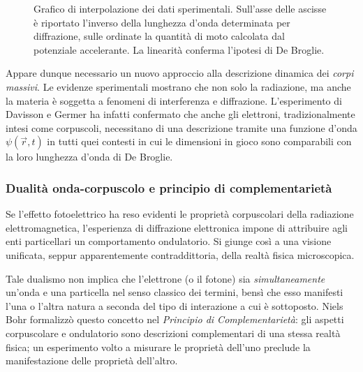 \documentclass[a4paper,11pt]{report}
\begin{document}
\begin{figure}[htbp]
    \caption{Grafico di interpolazione dei dati sperimentali. Sull'asse delle ascisse è riportato l'inverso della lunghezza d'onda determinata per diffrazione, sulle ordinate la quantità di moto calcolata dal potenziale accelerante. La linearità conferma l'ipotesi di De Broglie.}
    \label{fig:davisson_germer_plot}
\end{figure}

\noindent
Appare dunque necessario un nuovo approccio alla descrizione dinamica dei \textit{corpi massivi}. Le evidenze sperimentali mostrano che non solo la radiazione, ma anche la materia è soggetta a fenomeni di interferenza e diffrazione. L'esperimento di Davisson e Germer ha infatti confermato che anche gli elettroni, tradizionalmente intesi come corpuscoli, necessitano di una descrizione tramite una funzione d'onda $\psi(\vec{r}, t)$ in tutti quei contesti in cui le dimensioni in gioco sono comparabili con la loro lunghezza d'onda di De Broglie.

\subsubsection{Dualità onda-corpuscolo e principio di complementarietà}
Se l'effetto fotoelettrico ha reso evidenti le proprietà corpuscolari della radiazione elettromagnetica, l'esperienza di diffrazione elettronica impone di attribuire agli enti particellari un comportamento ondulatorio.
Si giunge così a una visione unificata, seppur apparentemente contraddittoria, della realtà fisica microscopica.

Tale dualismo non implica che l'elettrone (o il fotone) sia \textit{simultaneamente} un'onda e una particella nel senso classico dei termini, bensì che esso manifesti l'una o l'altra natura a seconda del tipo di interazione a cui è sottoposto. Niels Bohr formalizzò questo concetto nel \textit{Principio di Complementarietà}: gli aspetti corpuscolare e ondulatorio sono descrizioni complementari di una stessa realtà fisica; un esperimento volto a misurare le proprietà dell'uno preclude la manifestazione delle proprietà dell'altro.
\end{document}
